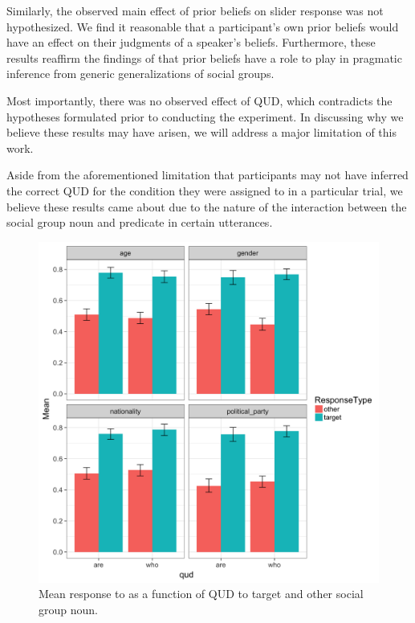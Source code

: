 \documentclass[11pt,a4paper]{article}
\begin{document}
Similarly, the observed main effect of prior beliefs on slider response was not hypothesized. We find it reasonable that a participant's own prior beliefs would have an effect on their judgments of a speaker's beliefs. Furthermore, these results reaffirm the findings of \citet{degen2017} that prior beliefs have a role to play in pragmatic inference from generic generalizations of social groups. 

Most importantly, there was no observed effect of QUD, which contradicts the hypotheses formulated prior to conducting the experiment. In discussing why we believe these results may have arisen, we will address a major limitation of this work.

Aside from the aforementioned limitation that participants may not have inferred the correct QUD for the condition they were assigned to in a particular trial, we believe these results came about due to the nature of the interaction between the social group noun and predicate in certain utterances. 

\begin{figure}[h]
\includegraphics[width=\linewidth]{qud_means_nounclass.png}
\caption{Mean response to as a function of QUD to target and other social group noun.}
\label{nounclass}
\end{figure}
\end{document}
